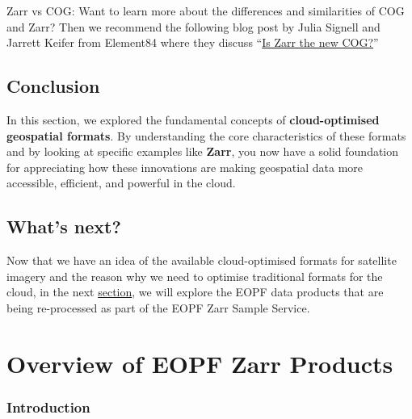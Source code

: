 \documentclass[
  letterpaper,
  DIV=11,
  numbers=noendperiod]{scrreprt}
\begin{document}
\begin{tcolorbox}[enhanced jigsaw, coltitle=black, colback=white, leftrule=.75mm, colbacktitle=quarto-callout-note-color!10!white, titlerule=0mm, title=\textcolor{quarto-callout-note-color}{\faInfo}\hspace{0.5em}{Note}, rightrule=.15mm, bottomrule=.15mm, bottomtitle=1mm, toptitle=1mm, arc=.35mm, toprule=.15mm, left=2mm, opacityback=0, colframe=quarto-callout-note-color-frame, opacitybacktitle=0.6, breakable]

Zarr vs COG: Want to learn more about the differences and similarities
of COG and Zarr? Then we recommend the following blog post by Julia
Signell and Jarrett Keifer from Element84 where they discuss
``\href{https://element84.com/software-engineering/is-zarr-the-new-cog/}{Is
Zarr the new COG?}''

\end{tcolorbox}

\section{Conclusion}\label{conclusion-1}

In this section, we explored the fundamental concepts of
\textbf{cloud-optimised geospatial formats}. By understanding the core
characteristics of these formats and by looking at specific examples
like \textbf{Zarr}, you now have a solid foundation for appreciating how
these innovations are making geospatial data more accessible, efficient,
and powerful in the cloud.

\section{What's next?}\label{whats-next-1}

Now that we have an idea of the available cloud-optimised formats for
satellite imagery and the reason why we need to optimise traditional
formats for the cloud, in the next
\href{./13_overview_eopf_datasets.qmd}{section}, we will explore the
EOPF data products that are being re-processed as part of the EOPF Zarr
Sample Service.

\chapter{Overview of EOPF Zarr
Products}\label{overview-of-eopf-zarr-products}

\subsection{Introduction}\label{introduction-2}
\end{document}
